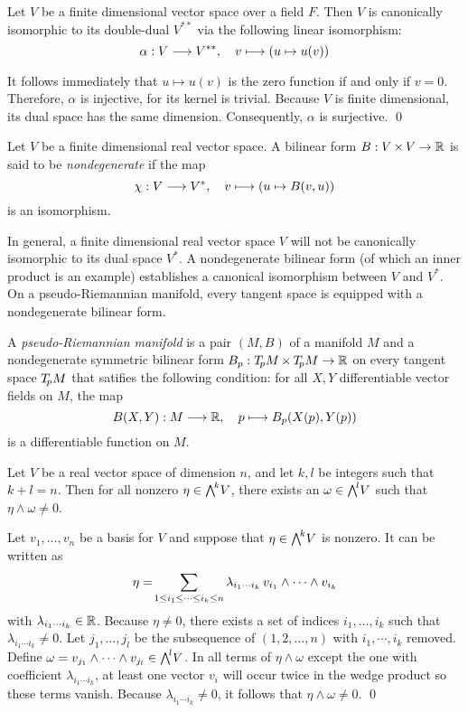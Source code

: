 Let $V$ be a finite dimensional vector space over a field $F$.
Then $V$ is canonically isomorphic to its double-dual $V^{**}$ via the following linear isomorphism:
\[ \alpha : V \longto V^{**},
\quad v \longmapsto (u \mapsto u(v)) \]

\proof
It follows immediately that $u \mapsto u(v)$ is the zero function
if and only if $v = 0$.
Therefore, $\alpha$ is injective,
for its kernel is trivial.
Because $V$ is finite dimensional,
its dual space has the same dimension.
Consequently, $\alpha$ is surjective.
\qed

Let $V$ be a finite dimensional real vector space.
A bilinear form $B : V \times V \to \R$ is said to be \emph{nondegenerate}
if the map
\[ \chi : V \longto V^*, \quad v \longmapsto (u \mapsto B(v, u)) \]
is an isomorphism.

In general, a finite dimensional real vector space $V$
will not be canonically isomorphic to its dual space $V^*\!$.
A nondegenerate bilinear form (of which an inner product is an example)
establishes a canonical isomorphism between $V$ and $V^*\!$.
On a pseudo-Riemannian manifold,
every tangent space is equipped with a nondegenerate bilinear form.

A \emph{pseudo-Riemannian manifold} is a pair $(M, B)$ of a manifold $M$
and a nondegenerate symmetric bilinear form $B_p : \Tp M \times \Tp M \to \R$
on every tangent space $\Tp M$ that satifies the following condition:
for all $X, Y$ differentiable vector fields on $M$,
the map
\vspace{-0.5\parskip}
\[ B(X, Y): M \longto \R, \quad p \longmapsto B_p(X(p), Y(p)) \]
is a differentiable function on $M$.

Let $V$ be a real vector space of dimension $n$,
and let $k, l$ be integers such that $k + l = n$.
Then for all nonzero $\eta \in \Lk V$,
there exists an $\omega \in \Ll V$
such that $\eta \wedge \omega \neq 0$.

\proof
Let $v_1, \ldots, v_n$ be a basis for $V$
and suppose that $\eta \in \Lk V$ is nonzero.
It can be written as
\[ \eta = \!\sum_{1 \leq i_1 \leq \cdots \leq i_k \leq n}
            \lambda_{i_1 \cdots i_k} \, v_{i_1} \wedge \cdots \wedge v_{i_k}
\vspace{0.5\parskip} \]
with $\lambda_{i_1 \cdots i_k} \in \R$.
Because $\eta \neq 0$,
there exists a set of indices $i_1, \ldots, i_k$ such that $\lambda_{i_1 \cdots i_k} \neq 0$.
Let $j_1, \ldots, j_l$ be the subsequence of $(1, 2, \ldots, n)$ with $i_1, \cdots, i_k$ removed.
Define $\omega = v_{j_1} \wedge \cdots \wedge v_{j_l} \in \Ll V$.
In all terms of $\eta \wedge \omega$ except the one with coefficient $\lambda_{i_1 \cdots i_k}$,
at least one vector $v_i$ will occur twice in the wedge product
so these terms vanish.
Because $\lambda_{i_1 \cdots i_k} \neq 0$,
it follows that $\eta \wedge \omega \neq 0$.
\qed

